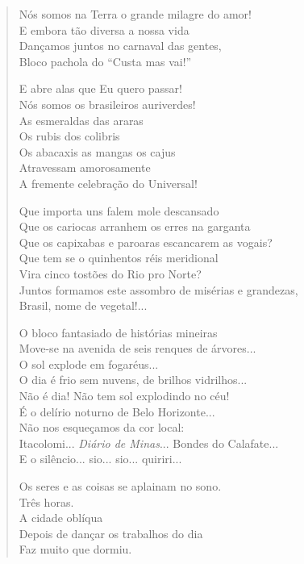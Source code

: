 \begin{verse}
Nós somos na Terra o grande milagre do amor!\\
E embora tão diversa a nossa vida\\
Dançamos juntos no carnaval das gentes,\\
Bloco pachola do ``Custa mas vai!''

E abre alas que Eu quero passar!\\
Nós somos os brasileiros auriverdes!\\
As esmeraldas das araras\\
Os rubis dos colibris\\
Os abacaxis as mangas os cajus\\
Atravessam amorosamente\\
A fremente celebração do Universal!

Que importa uns falem mole descansado\\
Que os cariocas arranhem os erres na garganta\\
Que os capixabas e paroaras escancarem as vogais?\\
Que tem se o quinhentos réis meridional\\
Vira cinco tostões do Rio pro Norte?\\
Juntos formamos este assombro de misérias e grandezas,\\
Brasil, nome de vegetal!...

O bloco fantasiado de histórias mineiras\\
Move-se na avenida de seis renques de árvores...\\
O sol explode em fogaréus...\\
O dia é frio sem nuvens, de brilhos vidrilhos...\\
Não é dia! Não tem sol explodindo no céu!\\
É o delírio noturno de Belo Horizonte...\\
Não nos esqueçamos da cor local:\\
Itacolomi... \emph{Diário de Minas}... Bondes do Calafate...\\
E o silêncio... sio... sio... quiriri...

Os seres e as coisas se aplainam no sono.\\
Três horas.\\
A cidade oblíqua\\
Depois de dançar os trabalhos do dia\\
Faz muito que dormiu.


\end{verse}
